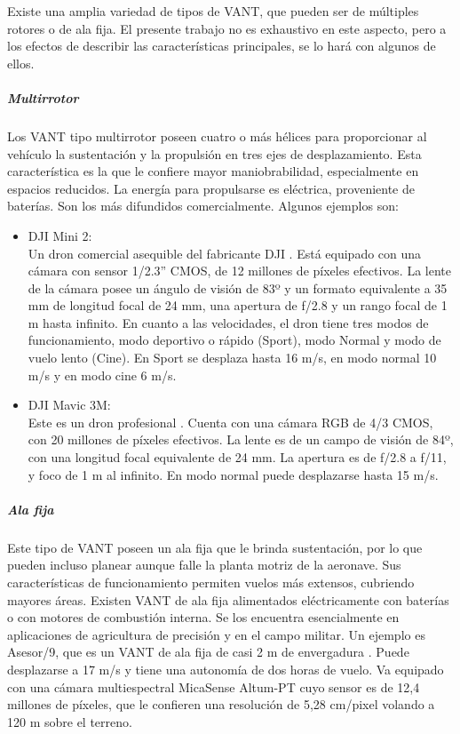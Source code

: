 Existe una amplia variedad de tipos de VANT, que pueden ser de múltiples rotores o de ala fija. El presente trabajo no es exhaustivo en este aspecto, pero a los efectos de describir las características principales, se lo hará con algunos de ellos.
\subparagraph{Multirrotor}
Los VANT tipo multirrotor poseen cuatro o más hélices para proporcionar al vehículo la sustentación y la propulsión en tres ejes de desplazamiento. Esta característica es la que le confiere mayor maniobrabilidad, especialmente en espacios reducidos. La energía para propulsarse es eléctrica, proveniente de baterías. Son los más difundidos comercialmente. Algunos ejemplos son:
\begin{itemize}
    \item DJI Mini 2:\\
    Un dron comercial asequible del fabricante DJI \cite{noauthor_dji_nodate-1}. Está equipado con una cámara con sensor 1/2.3” CMOS, de 12 millones de píxeles efectivos. La lente de la cámara posee un ángulo de visión de 83º y un formato equivalente a 35 mm de longitud focal de 24 mm, una apertura de f/2.8 y un rango focal de 1 m hasta infinito. En cuanto a las velocidades, el dron tiene tres modos de funcionamiento, modo deportivo o rápido (Sport), modo Normal y modo de vuelo lento (Cine). En Sport se desplaza hasta 16 m/s, en modo normal 10 m/s y en modo cine 6 m/s.
    \item DJI Mavic 3M:\\
    Este es un dron profesional \cite{noauthor_dji_nodate}. Cuenta con una cámara RGB de 4/3 CMOS, con 20 millones de píxeles efectivos. La lente es de un campo de visión de 84º, con una longitud focal equivalente de 24 mm. La apertura es de f/2.8 a f/11, y foco de 1 m al infinito. En modo normal puede desplazarse hasta 15 m/s.
\end{itemize}

\subparagraph{Ala fija}
Este tipo de VANT poseen un ala fija que le brinda sustentación, por lo que pueden incluso planear aunque falle la planta motriz de la aeronave. Sus características de funcionamiento permiten vuelos más extensos, cubriendo mayores áreas. Existen VANT de ala fija alimentados eléctricamente con baterías o con motores de combustión interna. Se los encuentra esencialmente en aplicaciones de agricultura de precisión y en el campo militar. Un ejemplo es Asesor/9, que es un VANT de ala fija de casi 2 m de envergadura \cite{noauthor_drone_nodate}. Puede desplazarse a 17 m/s y tiene una autonomía de dos horas de vuelo. Va equipado con una cámara multiespectral MicaSense Altum-PT \cite{noauthor_altum-pt_2023} cuyo sensor es de 12,4 millones de píxeles, que le confieren una resolución de 5,28 cm/pixel volando a 120 m sobre el terreno.

